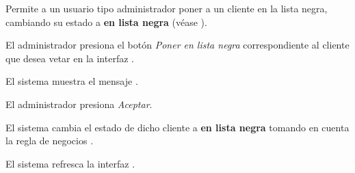 %
%

{
  Permite a un usuario tipo administrador poner a un cliente en la lista negra,
  cambiando su estado a \textbf{en lista negra} (véase
  ).

  \begin{trayectoriaPrincipal}

    \item El administrador presiona el botón \textit{Poner en lista negra}
      correspondiente al cliente que desea vetar en la interfaz
      .

    \item El sistema muestra el mensaje .

    \item El administrador presiona \textit{Aceptar}.

    \item El sistema cambia el estado de dicho cliente a \textbf{en lista negra}
      tomando en cuenta la regla de negocios .

    \item El sistema refresca la interfaz .

  \end{trayectoriaPrincipal}
}
